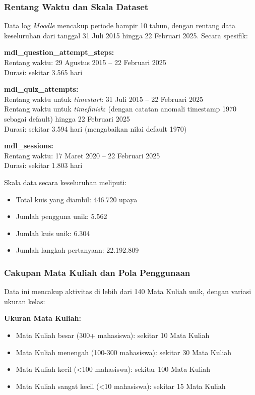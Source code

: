 \subsubsection{Rentang Waktu dan Skala Dataset}
\label{sec:rentangWaktuSkalaDataset}
Data log \textit{Moodle} mencakup periode hampir 10 tahun, dengan rentang data keseluruhan dari tanggal 31 Juli 2015 hingga 22 Februari 2025. Secara spesifik:

\textbf{mdl\_question\_attempt\_steps:} \\
Rentang waktu: 29 Agustus 2015 – 22 Februari 2025 \\
Durasi: sekitar 3.565 hari

\textbf{mdl\_quiz\_attempts:} \\
Rentang waktu untuk \textit{timestart}: 31 Juli 2015 – 22 Februari 2025 \\
Rentang waktu untuk \textit{timefinish}: (dengan catatan anomali timestamp 1970 sebagai default) hingga 22 Februari 2025 \\
Durasi: sekitar 3.594 hari (mengabaikan nilai default 1970)

\textbf{mdl\_sessions:} \\
Rentang waktu: 17 Maret 2020 – 22 Februari 2025 \\
Durasi: sekitar 1.803 hari

Skala data secara keseluruhan meliputi:
\begin{itemize}
    \item Total kuis yang diambil: 446.720 upaya
    \item Jumlah pengguna unik: 5.562
    \item Jumlah kuis unik: 6.304
    \item Jumlah langkah pertanyaan: 22.192.809
\end{itemize}

\subsubsection{Cakupan Mata Kuliah dan Pola Penggunaan}
\label{sec:cakupanMataKuliahPolaPenggunaan}
Data ini mencakup aktivitas di lebih dari 140 Mata Kuliah unik, dengan variasi ukuran kelas:

\textbf{Ukuran Mata Kuliah:}
\begin{itemize}
    \item Mata Kuliah besar (300+ mahasiswa): sekitar 10 Mata Kuliah
    \item Mata Kuliah menengah (100-300 mahasiswa): sekitar 30 Mata Kuliah
    \item Mata Kuliah kecil (<100 mahasiswa): sekitar 100 Mata Kuliah
    \item Mata Kuliah sangat kecil (<10 mahasiswa): sekitar 15 Mata Kuliah
\end{itemize}

